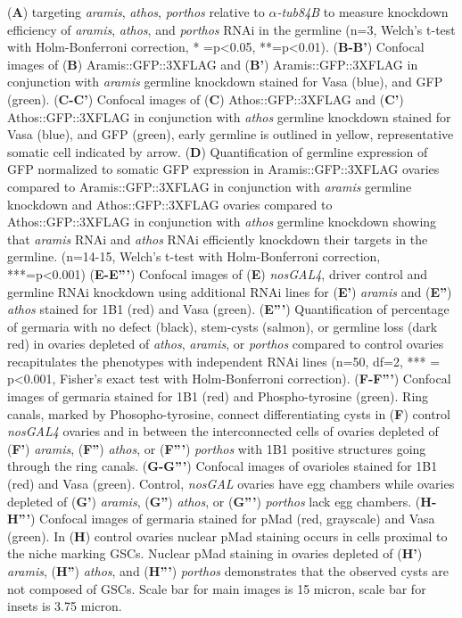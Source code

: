 \documentclass[12pt,oneside]{reedthesis}
\begin{document}
(\textbf{A}) targeting \emph{aramis}, \emph{athos}, \emph{porthos} relative to \(\alpha\)\emph{-tub84B} to
measure knockdown efficiency of \emph{aramis}, \emph{athos}, and \emph{porthos} RNAi in
the germline (n=3, Welch's t-test with Holm-Bonferroni correction, *
=p\textless0.05, **=p\textless0.01). (\textbf{B-B'}) Confocal images of (\textbf{B})
Aramis::GFP::3XFLAG and (\textbf{B'}) Aramis::GFP::3XFLAG in conjunction with
\emph{aramis} germline knockdown stained for Vasa (blue), and GFP (green).
(\textbf{C-C'}) Confocal images of (\textbf{C}) Athos::GFP::3XFLAG and (\textbf{C'})
Athos::GFP::3XFLAG in conjunction with \emph{athos} germline knockdown
stained for Vasa (blue), and GFP (green), early germline is outlined in
yellow, representative somatic cell indicated by arrow. (\textbf{D})
Quantification of germline expression of GFP normalized to somatic GFP
expression in Aramis::GFP::3XFLAG ovaries compared to
Aramis::GFP::3XFLAG in conjunction with \emph{aramis} germline knockdown and
Athos::GFP::3XFLAG ovaries compared to Athos::GFP::3XFLAG in conjunction
with \emph{athos} germline knockdown showing that \emph{aramis} RNAi and \emph{athos}
RNAi efficiently knockdown their targets in the germline. (n=14-15,
Welch's t-test with Holm-Bonferroni correction, ***=p\textless0.001)
(\textbf{E-E'''}) Confocal images of (\textbf{E}) \emph{nosGAL4}, driver control and
germline RNAi knockdown using additional RNAi lines for (\textbf{E'})
\emph{aramis} and (\textbf{E''}) \emph{athos} stained for 1B1 (red) and Vasa (green).
(\textbf{E'''}) Quantification of percentage of germaria with no defect
(black), stem-cysts (salmon), or germline loss (dark red) in ovaries
depleted of \emph{athos}, \emph{aramis}, or \emph{porthos} compared to control ovaries
recapitulates the phenotypes with independent RNAi lines (n=50, df=2,
*** = p\textless0.001, Fisher's exact test with Holm-Bonferroni correction).
(\textbf{F-F'''}) Confocal images of germaria stained for 1B1 (red) and
Phospho-tyrosine (green). Ring canals, marked by Phosopho-tyrosine,
connect differentiating cysts in (\textbf{F}) control \emph{nosGAL4} ovaries and
in between the interconnected cells of ovaries depleted of (\textbf{F'})
\emph{aramis}, (\textbf{F''}) \emph{athos}, or (\textbf{F'''}) \emph{porthos} with 1B1 positive
structures going through the ring canals. (\textbf{G-G'''}) Confocal images
of ovarioles stained for 1B1 (red) and Vasa (green). Control, \emph{nosGAL}
ovaries have egg chambers while ovaries depleted of (\textbf{G'}) \emph{aramis},
(\textbf{G''}) \emph{athos}, or (\textbf{G'''}) \emph{porthos} lack egg chambers.
(\textbf{H-H'''}) Confocal images of germaria stained for pMad (red,
grayscale) and Vasa (green). In (\textbf{H}) control ovaries nuclear pMad
staining occurs in cells proximal to the niche marking GSCs. Nuclear
pMad staining in ovaries depleted of (\textbf{H'}) \emph{aramis}, (\textbf{H''})
\emph{athos}, and (\textbf{H'''}) \emph{porthos} demonstrates that the observed cysts
are not composed of GSCs. Scale bar for main images is 15 micron, scale
bar for insets is 3.75 micron.
\end{document}
